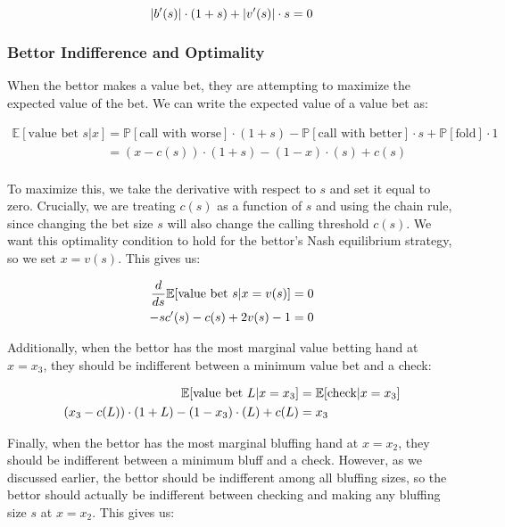 \documentclass[../../main/main.tex]{subfiles}
\begin{document}
\begin{equation}{\label{callindiff}}
    |b'(s)| \cdot (1 + s) + |v'(s)| \cdot s = 0
\end{equation}

\subsubsection{Bettor Indifference and Optimality}

When the bettor makes a value bet, they are attempting to maximize the expected value of the bet. We can write the expected value of a value bet as:

\begin{align*}
    \mathbb{E}[\text{value bet } s | x] & = \mathbb{P}[\text{call with worse}] \cdot (1+s) - \mathbb{P}[\text{call with better}] \cdot s + \mathbb{P}[\text{fold}] \cdot 1 \\
    & = (x-c(s)) \cdot (1+s) - (1-x) \cdot (s) + c(s)\\
\end{align*}

To maximize this, we take the derivative with respect to $s$ and set it equal to zero. Crucially, we are treating $c(s)$ as a function of $s$ and using the chain rule, since changing the bet size $s$ will also change the calling threshold $c(s)$. We want this optimality condition to hold for the bettor's Nash equilibrium strategy, so we set $x=v(s)$. This gives us:

\begin{align}{\label{valueoptimality}}
    \nonumber \frac{d}{ds} \mathbb{E}[\text{value bet } s | x=v(s)] & = 0 \\
    -sc'(s) - c(s) + 2 v(s) - 1 & = 0
\end{align}

Additionally, when the bettor has the most marginal value betting hand at $x=x_3$, they should be indifferent between a minimum value bet and a check: 

\begin{align}{\label{valueindiff}}
    \nonumber \mathbb{E}[\text{value bet } L | x=x_3] & = \mathbb{E}[\text{check} | x=x_3]\\ 
    (x_3-c(L)) \cdot (1+L) - (1-x_3) \cdot (L) + c(L) & = x_3
\end{align}

Finally, when the bettor has the most marginal bluffing hand at $x=x_2$, they should be indifferent between a minimum bluff and a check. However, as we discussed earlier, the bettor should be indifferent among all bluffing sizes, so the bettor should actually be indifferent between checking and making any bluffing size $s$ at $x=x_2$. This gives us:
\end{document}
